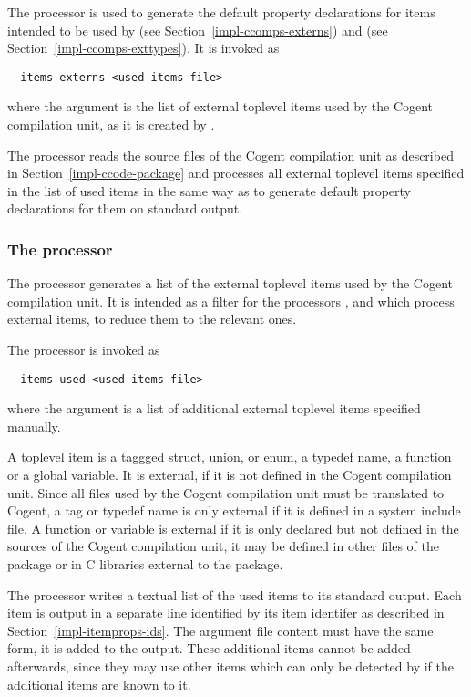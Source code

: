 The processor  is used to generate the default property declarations for items intended
to be used by  (see Section~\ref{impl-ccomps-externs}) and  
(see Section~\ref{impl-ccomps-exttypes}). It is invoked as
\begin{verbatim}
  items-externs <used items file>
\end{verbatim}
where the argument is the list of external toplevel items used by the Cogent compilation unit, as it is created 
by .

The processor reads the source files of the Cogent compilation unit as described in Section~\ref{impl-ccode-package}
and processes all external toplevel items specified in the list of used items in the same way as 
to generate default property declarations for them on standard output.

\subsubsection{The processor }

The processor  generates a list of the external toplevel items used by the Cogent compilation unit.
It is intended as a filter for the processors ,  and  
which process external items, to reduce them to the relevant ones.

The processor is invoked as
\begin{verbatim}
  items-used <used items file>
\end{verbatim}
where the argument is a list of additional external toplevel items specified manually.

A toplevel item is a taggged struct, union, or enum, a typedef name, a function or a global variable. It is external, 
if it is not defined in the Cogent compilation unit. Since all  files used by the Cogent compilation unit 
must be translated to Cogent, a tag or typedef name is only external if it is defined in a system include file.
A function or variable is external if it is only declared but not defined in the sources of the Cogent compilation unit,
it may be defined in other  files of the package or in C libraries external to the package.

The processor writes a textual list of the used items to its standard output. Each item is output in a separate line 
identified by its item identifer as described in Section~\ref{impl-itemprops-ids}. The argument file content must have the 
same form, it is added to the output. These additional items cannot be added afterwards, since they may use other items
which can only be detected by  if the additional items are known to it.

